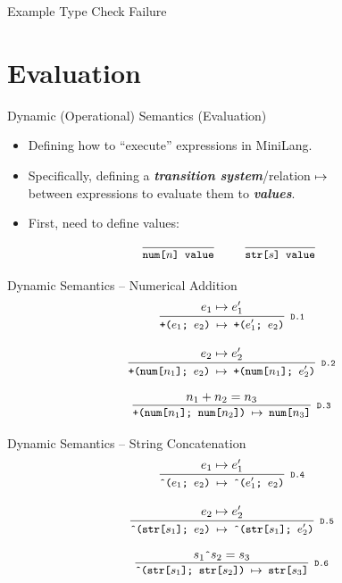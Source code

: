 \documentclass{beamer}
\renewcommand{\emph}[1]{\textbf{\textit{#1}}}
\begin{document}
\begin{frame}{Example Type Check Failure}
\begin{center}
\end{center}
\end{frame}


\section{Evaluation}

\begin{frame}{Dynamic (Operational) Semantics (Evaluation)}
\begin{itemize}
\item Defining how to ``execute'' expressions in MiniLang.
\item Specifically, defining a \emph{transition system}/relation
$\mapsto$ \\
between expressions to evaluate them to \emph{values}.
\item First, need to define values:
\end{itemize}
\[
\cinfer{num[$n$] value}{ }
\qquad
\cinfer{str[$s$] value}{ }
\]
\end{frame}


\begin{frame}{Dynamic Semantics -- Numerical Addition}
\[
\cinfer[D.1]{+($e_1$; $e_2$) $\stepto$ +($e'_1$; $e_2$)}{e_1 \stepto e'_1}
\]

\[
\cinfer[D.2]{+(num[$n_1$]; $e_2$) $\stepto$ +(num[$n_1$]; $e'_2$)}{e_2 \stepto e'_2}
\]

\[
\cinfer[D.3]{+(num[$n_1$]; num[$n_2$]) $\stepto$ num[$n_3$]}{n_1 + n_2 = n_3}
\]
\end{frame}

\begin{frame}{Dynamic Semantics -- String Concatenation}
\[
\cinfer[D.4]{\^{}($e_1$; $e_2$) $\stepto$ \^{}($e'_1$; $e_2$)}{e_1 \stepto e'_1}
\]

\[
\cinfer[D.5]{\^{}(str[$s_1$]; $e_2$) $\stepto$ \^{}(str[$s_1$]; $e'_2$)}{e_2 \stepto e'_2}
\]

\[
\cinfer[D.6]{\^{}(str[$s_1$]; str[$s_2$]) $\stepto$ str[$s_3$]}{s_1 \code{\^{}} s_2 = s_3}
\]
\end{frame}
\end{document}
